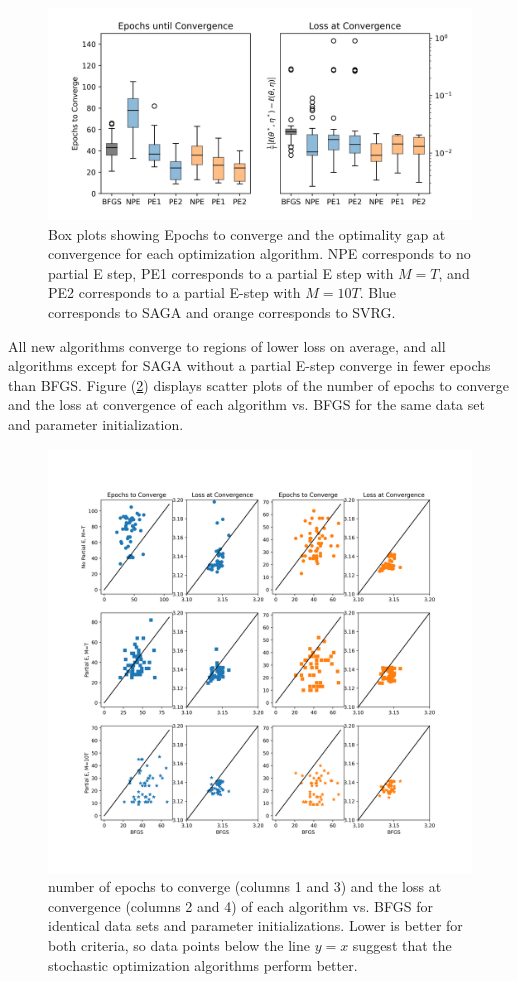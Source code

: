 \begin{figure}
    \centering
    \includegraphics[width=6.5in]{../plt/boxplots_case_study.png}
    \caption{Box plots showing Epochs to converge and the optimality gap at convergence for each optimization algorithm. NPE corresponds to no partial E step, PE1 corresponds to a partial E step with $M=T$, and PE2 corresponds to a partial E-step with $M=10T$. Blue corresponds to SAGA and orange corresponds to SVRG.}
    \label{fig:boxplots_case}
\end{figure}
%
All new algorithms converge to regions of lower loss on average, and all algorithms except for SAGA without a partial E-step converge in fewer epochs than BFGS.
%
Figure (\ref{fig:scatter_case}) displays scatter plots of the number of epochs to converge and the loss at convergence of each algorithm vs. BFGS for the same data set and parameter initialization.
%
\begin{figure}
    \centering
    \includegraphics[width=6.5in]{../plt/paired_scatter_case_study.png}
    \caption{number of epochs to converge (columns 1 and 3) and the loss at convergence (columns 2 and 4) of each algorithm vs. BFGS for identical data sets and parameter initializations. Lower is better for both criteria, so data points below the line $y=x$ suggest that the stochastic optimization algorithms perform better.}
    \label{fig:scatter_case}
\end{figure}
